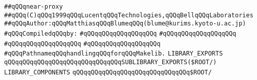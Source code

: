 \label{src/lib/core/internal/srcpath.lib}
\verb|##qQQqnear-proxy|\newline
\verb|##qQQq(C)qQQq1999qQQqLucentqQQqTechnologies,qQQqBellqQQqLaboratories|\newline
\verb|##qQQqAuthor:qQQqMatthiasqQQqBlumeqQQq(blume@kurims.kyoto-u.ac.jp)|\newline
\newline
\verb|#qQQqCompiledqQQqby:|\newline
\verb|#qQQqqQQqqQQqqQQqqQQq|\newline
\verb|#qQQqqQQqqQQqqQQqqQQq|\newline
\verb|#qQQqqQQqqQQqqQQqqQQq|\newline
\verb|#qQQqqQQqqQQqqQQqqQQq|\newline
\newline
\verb|#qQQqPathnameqQQqhandlingqQQqforqQQqMakelib.|\newline
\newline
\newline
\newline
\verb|LIBRARY_EXPORTS|\newline
\newline
\verb|qQQqqQQqqQQqqQQqqQQqqQQqqQQqqQQqSUBLIBRARY_EXPORTS($ROOT/|\verb|)|\newline
\newline
\newline
\newline
\verb|LIBRARY_COMPONENTS|\newline
\newline
\verb|qQQqqQQqqQQqqQQqqQQqqQQqqQQqqQQq$ROOT/|\newline

